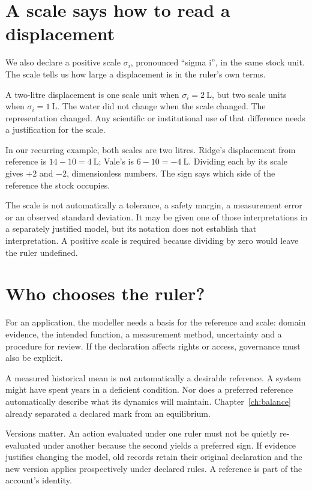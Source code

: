 \section{A scale says how to read a displacement}
We also declare a positive scale $\sigma_i$, pronounced ``sigma i'', in the same stock unit. The scale tells us how large a displacement is in the ruler's own terms.

A two-litre displacement is one scale unit when $\sigma_i=2\ \mathrm{L}$, but two scale units when $\sigma_i=1\ \mathrm{L}$. The water did not change when the scale changed. The representation changed. Any scientific or institutional use of that difference needs a justification for the scale.

In our recurring example, both scales are two litres. Ridge's displacement from reference is $14-10=4\ \mathrm{L}$; Vale's is $6-10=-4\ \mathrm{L}$. Dividing each by its scale gives $+2$ and $-2$, dimensionless numbers. The sign says which side of the reference the stock occupies.

The scale is not automatically a tolerance, a safety margin, a measurement error or an observed standard deviation. It may be given one of those interpretations in a separately justified model, but its notation does not establish that interpretation. A positive scale is required because dividing by zero would leave the ruler undefined.

\section{Who chooses the ruler?}
For an application, the modeller needs a basis for the reference and scale: domain evidence, the intended function, a measurement method, uncertainty and a procedure for review. If the declaration affects rights or access, governance must also be explicit.

A measured historical mean is not automatically a desirable reference. A system might have spent years in a deficient condition. Nor does a preferred reference automatically describe what its dynamics will maintain. Chapter~\ref{ch:balance} already separated a declared mark from an equilibrium.

Versions matter. An action evaluated under one ruler must not be quietly re-evaluated under another because the second yields a preferred sign. If evidence justifies changing the model, old records retain their original declaration and the new version applies prospectively under declared rules. A reference is part of the account's identity.

